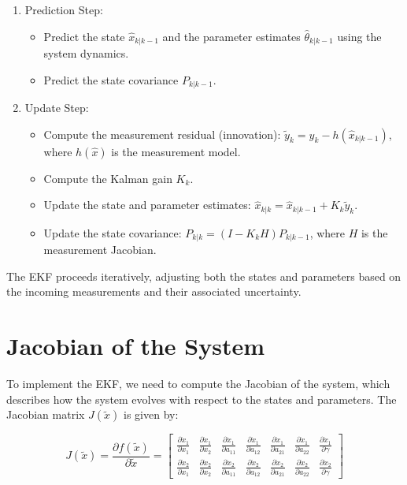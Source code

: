 \documentclass[a4paper,10pt]{report}
\begin{document}
\begin{enumerate}

\item Prediction Step:
\begin{itemize}
\item Predict the state \( \hat{x}_{k|k-1} \) and the parameter estimates \( \hat{\theta}_{k|k-1} \) using the system dynamics.
\item Predict the state covariance \( P_{k|k-1} \).
\end{itemize}

\item Update Step:
\begin{itemize}
\item Compute the measurement residual (innovation): \( \tilde{y}_k = y_k - h(\hat{x}_{k|k-1}) \), where \( h(\hat{x}) \) is the measurement model.
\item Compute the Kalman gain \( K_k \).
\item Update the state and parameter estimates: \( \hat{x}_{k|k} = \hat{x}_{k|k-1} + K_k \tilde{y}_k \).
\item Update the state covariance: \( P_{k|k} = (I - K_k H) P_{k|k-1} \), where \( H \) is the measurement Jacobian.
\end{itemize}
\end{enumerate}

The EKF proceeds iteratively, adjusting both the states and parameters based on the incoming measurements and their associated uncertainty.

\section{Jacobian of the System}

To implement the EKF, we need to compute the Jacobian of the system, which describes how the system evolves with respect to the states and parameters. The Jacobian matrix \( J(\tilde{x}) \) is given by:

\[
J(\tilde{x}) = \frac{\partial f(\tilde{x})}{\partial \tilde{x}} = \begin{bmatrix}
\frac{\partial \dot{x}_1}{\partial x_1} & \frac{\partial \dot{x}_1}{\partial x_2} & \frac{\partial \dot{x}_1}{\partial a_{11}} & \frac{\partial \dot{x}_1}{\partial a_{12}} & \frac{\partial \dot{x}_1}{\partial a_{21}} & \frac{\partial \dot{x}_1}{\partial a_{22}} & \frac{\partial \dot{x}_1}{\partial \gamma} \\
\frac{\partial \dot{x}_2}{\partial x_1} & \frac{\partial \dot{x}_2}{\partial x_2} & \frac{\partial \dot{x}_2}{\partial a_{11}} & \frac{\partial \dot{x}_2}{\partial a_{12}} & \frac{\partial \dot{x}_2}{\partial a_{21}} & \frac{\partial \dot{x}_2}{\partial a_{22}} & \frac{\partial \dot{x}_2}{\partial \gamma}
\end{bmatrix}
\]
\end{document}
